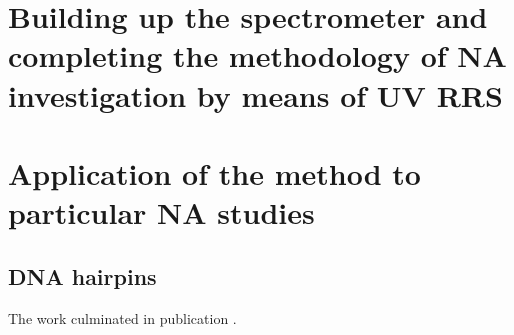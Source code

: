 \chapter[%
	Building up the spectrometer and completing the methodology of NA
	investigation by means of UV RRS
]{%
	Building up the spectrometer and completing the methodology of NA
	investigation by means of UV RRS
}
\label{spectrometer_building}








\chapter[%
	Application of the method to particular NA studies
]{%
	Application of the method to particular NA studies
}




\section{DNA hairpins}

The work culminated in publication \textcite{Klener2021}.



